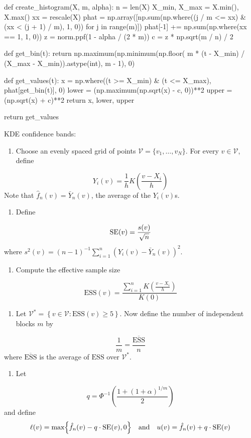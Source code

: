 \begin{python}
def create_histogram(X, m, alpha):
    n = len(X)
    X_min, X_max = X.min(), X.max()
    xx = rescale(X)
    phat = np.array([np.sum(np.where((j / m <= xx) & (xx < (j + 1) / m), 1, 0)) 
                                     for j in range(m)])
    phat[-1] += np.sum(np.where(xx == 1, 1, 0))
    z = norm.ppf(1 - alpha / (2 * m))
    c = z * np.sqrt(m / n) / 2
    
    def get_bin(t):
        return np.maximum(np.minimum(np.floor(
            m * (t - X_min) / (X_max - X_min)).astype(int), m - 1), 0)
    
    def get_values(t):
        x = np.where((t >= X_min) & (t <= X_max), phat[get_bin(t)], 0)
        lower = (np.maximum(np.sqrt(x) - c, 0))**2
        upper = (np.sqrt(x) + c)**2
        return x, lower, upper
    
    return get_values
\end{python}
KDE confidence bands:
\begin{enumerate}[tightlist,label={\arabic*.}]
\item
  Choose an evenly spaced grid of points
  \(\mathcal{V} = \{ v_{1}, \dots, v_N \}\). For every
  \(v \in \mathcal{V}\), define
\end{enumerate}
\[
Y_{i}(v) = \frac{1}{h} K \left( \frac{v - X_{i}}{h} \right)
\]
Note that \(\hat{f}_{n}(v) = \bar{Y}_{n}(v)\), the average of the
\(Y_{i}(v)\)s.
\begin{enumerate}[tightlist,label={\arabic*.}]
\item
  Define
\end{enumerate}
\[
\operatorname{\mathrm{SE}} (v) = \frac{s(v)}{\sqrt{n}}
\]
where
\(s^{2}(v) = (n - 1)^{-1} \sum_{i=1}^{n} ( Y_{i}(v) - \bar{Y}_{n}(v) )^{2}\).
\begin{enumerate}[tightlist,label={\arabic*.},resume]
\item
  Compute the effective sample size
\end{enumerate}
\[
\text{ESS}(v) = \frac{\sum_{i=1}^{n} K\left( \frac{v - X_{i}}{h} \right)}{K(0)}
\]
\begin{enumerate}[tightlist,label={\arabic*.},resume]
\item
  Let
  \(\mathcal{V}^{*} = \left\{ v \in \mathcal{V} : \text{ESS}(v) \geq 5 \right\}\).
  Now define the number of independent blocks \(m\) by
\end{enumerate}
\[
\frac{1}{m} = \frac{\overline{\text{ESS}}}{n}
\]
where \(\overline{\text{ESS}}\) is the average of \(\text{ESS}\) over
\(\mathcal{V}^{*}\).
\begin{enumerate}[tightlist,label={\arabic*.},resume]
\item
  Let
\end{enumerate}
\[
q = \Phi^{-1} \left( \frac{1 + (1 + \alpha)^{1/m}}{2} \right)
\]
and define
\[
\ell(v) = \text{max} \left\{ \hat{f}_{n}(v) - q \cdot \SE (v), 0 \right\}
\quad \text{and} \quad
u(v) = \hat{f}_{n}(v) + q \cdot \SE (v)
\]

